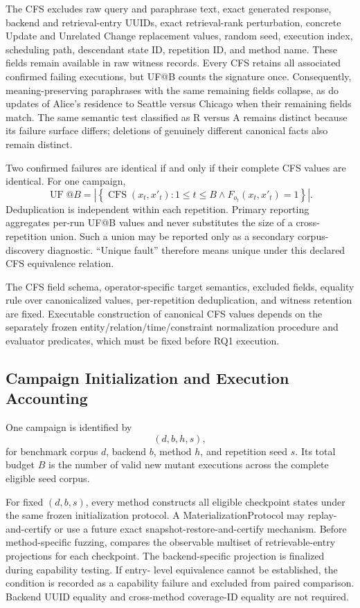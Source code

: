 The CFS excludes raw query and paraphrase text, exact generated response,
backend and retrieval-entry UUIDs, exact retrieval-rank perturbation, concrete
Update and Unrelated Change replacement values, random seed, execution index,
scheduling path, descendant state ID, repetition ID, and method name. These
fields remain available in raw witness records. Every CFS retains all
associated confirmed failing executions, but UF@B counts the signature once.
Consequently, meaning-preserving paraphrases with the same remaining fields
collapse, as do updates of Alice's residence to Seattle versus Chicago when
their remaining fields match. The same semantic test classified as
\(\mathrm{R}\) versus \(\mathrm{A}\) remains distinct because its failure
surface differs; deletions of genuinely different canonical facts also remain
distinct.

Two confirmed failures are identical if and only if their complete CFS values
are identical. For one campaign,
\[
\operatorname{UF}@B=
\left|\left\{\operatorname{CFS}(x_t,x'_t):1\leq t\leq B
\land F_{o_t}(x_t,x'_t)=1\right\}\right|.
\]
Deduplication is independent within each repetition. Primary reporting
aggregates per-run UF@B values and never substitutes the size of a cross-
repetition union. Such a union may be reported only as a secondary corpus-
discovery diagnostic. “Unique fault” therefore means unique under this declared
CFS equivalence relation.

The CFS field schema, operator-specific target semantics, excluded fields,
equality rule over canonicalized values, per-repetition deduplication, and
witness retention are fixed. Executable construction of canonical CFS values
depends on the separately frozen entity/relation/time/constraint normalization
procedure and evaluator predicates, which must be fixed before RQ1 execution.

\subsection{Campaign Initialization and Execution Accounting}
\label{app:campaign-accounting}

One campaign is identified by
\[
(d,b,h,s),
\]
for benchmark corpus \(d\), backend \(b\), method \(h\), and repetition seed
\(s\). Its total budget \(B\) is the number of valid new mutant executions
across the complete eligible seed corpus.

For fixed \((d,b,s)\), every method constructs all eligible checkpoint states
under the same frozen initialization protocol. A MaterializationProtocol may
replay-and-certify or use a future exact snapshot-restore-and-certify
mechanism. Before method-specific fuzzing, \system compares the
observable multiset of retrievable-entry projections for each checkpoint. The
backend-specific projection is finalized during capability testing. If entry-
level equivalence cannot be established, the condition is recorded as a
capability failure and excluded from paired comparison. Backend UUID equality
and cross-method coverage-ID equality are not required.

